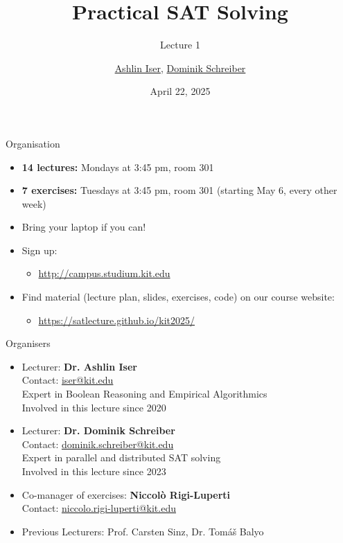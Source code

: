 \documentclass[t]{sdqbeamer}
\title{Practical SAT Solving}
\subtitle{Lecture 1 \unimp{\normalfont --  Organization, Introduction, Incremental SAT Solving}}
\author{\underline{Ashlin Iser}, \underline{Dominik Schreiber}}
\date{April 22, 2025}
\begin{document}
\begin{frame}[title white horizontal, picture=logos/blender-render, kitlogo=rgb]
	\titlepage
\end{frame}

\begin{frame}{Organisation}
	\begin{itemize}\setlength{\itemsep}{1em}
		\item \textbf{14 lectures:} Mondays at 3:45 pm, room 301
		\item \textbf{7 exercises:} Tuesdays at 3:45 pm, room 301 (starting May 6, every other week)
		\item Bring your laptop if you can!
		\item Sign up:
		\begin{itemize}
			\item \url{http://campus.studium.kit.edu}
		\end{itemize}
		\item Find material (lecture plan, slides, exercises, code) on our course website:
		\begin{itemize}
			\item \large\url{https://satlecture.github.io/kit2025/}
		\end{itemize}
	\end{itemize}
\end{frame}

\begin{frame}{Organisers}
	\begin{itemize}\setlength{\itemsep}{1em}
		\item Lecturer: \textbf{Dr. Ashlin Iser} \hfill{}\\
		Contact: \href{mailto:iser@kit.edu}{iser@kit.edu}\\[1ex]
		Expert in Boolean Reasoning and Empirical Algorithmics\\[1ex]
		Involved in this lecture since 2020 \\[1ex]
		\item Lecturer: \textbf{Dr. Dominik Schreiber} \hfill{}\\
		Contact: \href{mailto:dominik.schreiber@kit.edu}{dominik.schreiber@kit.edu}\\[1ex]
		Expert in {parallel and distributed} SAT solving\\[1ex]
		Involved in this lecture since 2023 \\[1ex]
		\item Co-manager of exercises: \textbf{Niccolò Rigi-Luperti} \hfill{}\\
		Contact: \href{mailto:niccolo.rigi-luperti@kit.edu}{niccolo.rigi-luperti@kit.edu}\\[1ex]
		\item {Previous Lecturers}: {Prof. Carsten Sinz}, {Dr. Tom\'a\v{s} Balyo}\\
	\end{itemize}
\end{frame}
\end{document}
